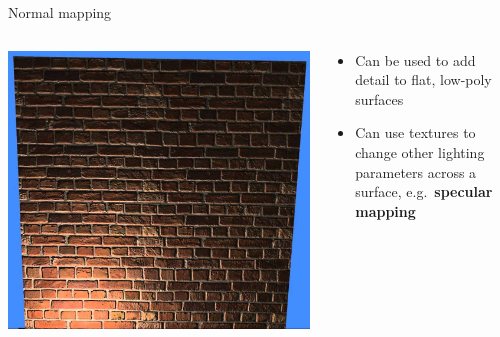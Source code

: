 \begin{frame}{Normal mapping}
\begin{columns}
\begin{column}{0.33\textwidth}
			\includegraphics[width=\textwidth]{normal_mapped_wall}
		\end{column}
		\begin{column}{0.65\textwidth}
			\begin{itemize}
				\item Can be used to add detail to flat, low-poly surfaces
				\pause\item Can use textures to change other lighting parameters across a surface,
					e.g.\ \textbf{specular mapping}
			\end{itemize}
		\end{column}
	\end{columns}
\end{frame}
